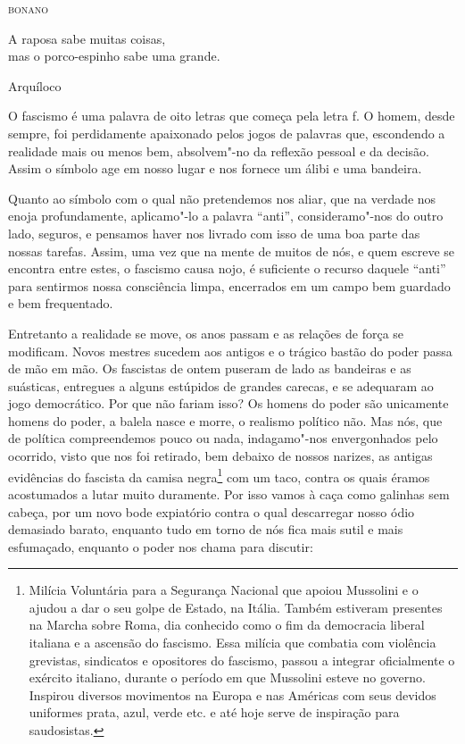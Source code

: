 \hfill{}\textsc{bonano}

\bigskip

\epigraph{A raposa sabe muitas coisas,\\mas o porco-espinho sabe uma grande.}{Arquíloco}


O fascismo é uma palavra de oito letras que começa pela letra f. O
homem, desde sempre, foi perdidamente apaixonado pelos jogos de palavras
que, escondendo a realidade mais ou menos bem, absolvem"-no da reflexão
pessoal e da decisão. Assim o símbolo age em nosso lugar e nos fornece
um álibi e uma bandeira.

Quanto ao símbolo com o qual não pretendemos nos aliar, que na verdade
nos enoja profundamente, aplicamo"-lo a palavra ``anti'', consideramo"-nos
do outro lado, seguros, e pensamos haver nos livrado com isso de uma boa
parte das nossas tarefas. Assim, uma vez que na mente de muitos de nós,
e quem escreve se encontra entre estes, o fascismo causa nojo, é
suficiente o recurso daquele ``anti'' para sentirmos nossa consciência
limpa, encerrados em um campo bem guardado e bem frequentado.

Entretanto a realidade se move, os anos passam e as relações de força se
modificam. Novos mestres sucedem aos antigos e o trágico bastão do poder
passa de mão em mão. Os fascistas de ontem puseram de lado as bandeiras
e as suásticas, entregues a alguns estúpidos de grandes carecas, e se
adequaram ao jogo democrático. Por que não fariam isso? Os homens do
poder são unicamente homens do poder, a balela nasce e morre, o realismo
político não. Mas nós, que de política compreendemos pouco ou nada,
indagamo"-nos envergonhados pelo ocorrido, visto que nos foi retirado,
bem debaixo de nossos narizes, as antigas evidências do fascista da
camisa negra\footnote{Milícia Voluntária para a Segurança Nacional que apoiou Mussolini e o
  ajudou a dar o seu golpe de Estado, na Itália. Também estiveram
  presentes na Marcha sobre Roma, dia conhecido como o fim da democracia
  liberal italiana e a ascensão do fascismo. Essa milícia que combatia
  com violência grevistas, sindicatos e opositores do fascismo, passou a
  integrar oficialmente o exército italiano, durante o período em que
  Mussolini esteve no governo. Inspirou diversos movimentos na Europa e
  nas Américas com seus devidos uniformes prata, azul, verde etc. e até
  hoje serve de inspiração para saudosistas.} com um taco, contra os quais éramos acostumados a lutar
muito duramente. Por isso vamos à caça como galinhas sem cabeça, por um
novo bode expiatório contra o qual descarregar nosso ódio demasiado
barato, enquanto tudo em torno de nós fica mais sutil e mais esfumaçado,
enquanto o poder nos chama para discutir:

